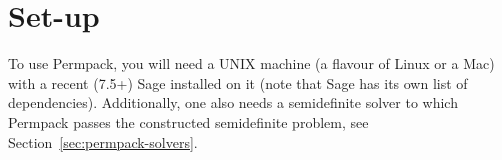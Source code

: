 \documentclass[12pt, a4paper, twoside]{report}
\begin{document}




\section{Set-up}
\label{sec:permpack-setup}

To use Permpack, you will need a UNIX machine (a flavour of Linux or a Mac) with a recent (7.5+) Sage installed on it (note that Sage has its own list of dependencies). Additionally, one also needs a semidefinite solver to which Permpack passes the constructed semidefinite problem, see Section~\ref{sec:permpack-solvers}.
\end{document}
